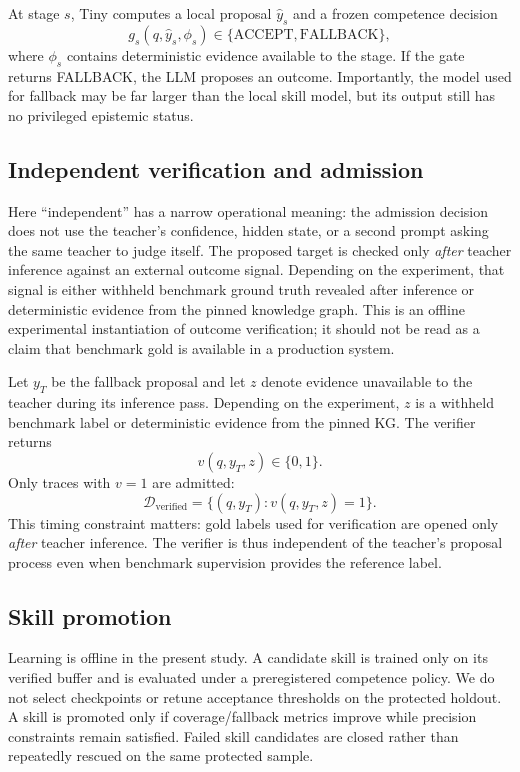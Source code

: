 \documentclass[10pt]{article}
\begin{document}
At stage $s$, Tiny computes a local proposal $\hat y_s$ and a frozen competence decision
\[
g_s(q,\hat y_s,\phi_s)\in\{\mathrm{ACCEPT},\mathrm{FALLBACK}\},
\]
where $\phi_s$ contains deterministic evidence available to the stage. If the gate returns FALLBACK, the LLM proposes an outcome. Importantly, the model used for fallback may be far larger than the local skill model, but its output still has no privileged epistemic status.


\subsection{Independent verification and admission}
Here ``independent'' has a narrow operational meaning: the admission decision
does not use the teacher's confidence, hidden state, or a second prompt asking
the same teacher to judge itself. The proposed target is checked only
\emph{after} teacher inference against an external outcome signal. Depending on
the experiment, that signal is either withheld benchmark ground truth revealed
after inference or deterministic evidence from the pinned knowledge graph. This
is an offline experimental instantiation of outcome verification; it should not
be read as a claim that benchmark gold is available in a production system.

Let $y_T$ be the fallback proposal and let $z$ denote evidence unavailable to the teacher during its inference pass. Depending on the experiment, $z$ is a withheld benchmark label or deterministic evidence from the pinned KG. The verifier returns
\[
v(q,y_T,z)\in\{0,1\}.
\]
Only traces with $v=1$ are admitted:
\[
\mathcal D_{\mathrm{verified}}=\{(q,y_T):v(q,y_T,z)=1\}.
\]
This timing constraint matters: gold labels used for verification are opened only \emph{after} teacher inference. The verifier is thus independent of the teacher's proposal process even when benchmark supervision provides the reference label.

\subsection{Skill promotion}
Learning is offline in the present study. A candidate skill is trained only on its verified buffer and is evaluated under a preregistered competence policy. We do not select checkpoints or retune acceptance thresholds on the protected holdout. A skill is promoted only if coverage/fallback metrics improve while precision constraints remain satisfied. Failed skill candidates are closed rather than repeatedly rescued on the same protected sample.
\end{document}
